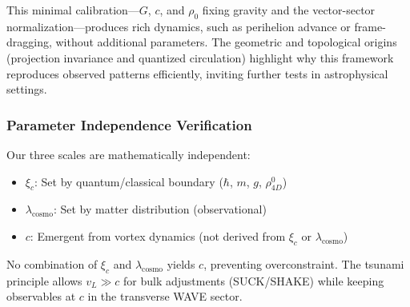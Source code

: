 This minimal calibration---$G$, $c$, and $\rho_0$ fixing gravity and the vector-sector normalization—produces rich dynamics, such as perihelion advance or frame-dragging, without additional parameters. The geometric and topological origins (projection invariance and quantized circulation) highlight why this framework reproduces observed patterns efficiently, inviting further tests in astrophysical settings.

\subsubsection{Parameter Independence Verification}

Our three scales are mathematically independent:
\begin{itemize}
\item $\xi_c$: Set by quantum/classical boundary ($\hbar$, $m$, $g$, $\rho_{4D}^0$)
\item $\lambda_{\text{cosmo}}$: Set by matter distribution (observational)
\item $c$: Emergent from vortex dynamics (not derived from $\xi_c$ or $\lambda_{\text{cosmo}}$)
\end{itemize}

No combination of $\xi_c$ and $\lambda_{\text{cosmo}}$ yields $c$, preventing overconstraint. The tsunami principle allows $v_L \gg c$ for bulk adjustments (SUCK/SHAKE) while keeping observables at $c$ in the transverse WAVE sector.

\medskip
\noindent
{}
\medskip

